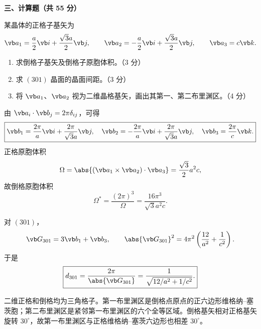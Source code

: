 \textbf{三、计算题（共 55 分）}

\begin{question}[10 分]
某晶体的正格子基矢为
\[
  \vb a_1=\frac a2\vb i+\frac{\sqrt3a}{2}\vb j,\qquad
  \vb a_2=-\frac a2\vb i+\frac{\sqrt3a}{2}\vb j,\qquad
  \vb a_3=c\vb k.
\]
\begin{enumerate}
  \item 求倒格子基矢及倒格子原胞体积。（3 分）
  \item 求 $(301)$ 晶面的晶面间距。（3 分）
  \item 将 $\vb a_1$、$\vb a_2$ 视为二维晶格基矢，画出其第一、第二布里渊区。（4 分）
\end{enumerate}


\begin{solution}
由 $\vb a_i\cdot\vb b_j=2\pi\delta_{ij}$，可得
\[
 \boxed{\vb b_1=\frac{2\pi}{a}\vb i+\frac{2\pi}{\sqrt3a}\vb j,\quad
 \vb b_2=-\frac{2\pi}{a}\vb i+\frac{2\pi}{\sqrt3a}\vb j,\quad
 \vb b_3=\frac{2\pi}{c}\vb k.}
\]
正格原胞体积
\[
 \Omega=\abs{(\vb a_1\times\vb a_2)\cdot\vb a_3}
 =\frac{\sqrt3}{2}a^2c,
\]
故倒格原胞体积
\[
 \boxed{\Omega^*=\frac{(2\pi)^3}{\Omega}
 =\frac{16\pi^3}{\sqrt3a^2c}.}
\]

对 $(301)$，
\[
 \vb G_{301}=3\vb b_1+\vb b_3,
 \qquad
 \abs{\vb G_{301}}^2=4\pi^2\left(\frac{12}{a^2}+\frac1{c^2}\right).
\]
于是
\[
 \boxed{d_{301}=\frac{2\pi}{\abs{\vb G_{301}}}
 =\frac1{\sqrt{12/a^2+1/c^2}}.}
\]

二维正格和倒格均为三角格子。第一布里渊区是倒格点原点的正六边形维格纳--塞茨胞；第二布里渊区是紧邻第一布里渊区的六个全等区域。倒格基矢相对正格基矢旋转 $30^\circ$，故第一布里渊区与正格维格纳--塞茨六边形也相差 $30^\circ$。
\begin{center}
\end{center}
\end{solution}
\end{question}

